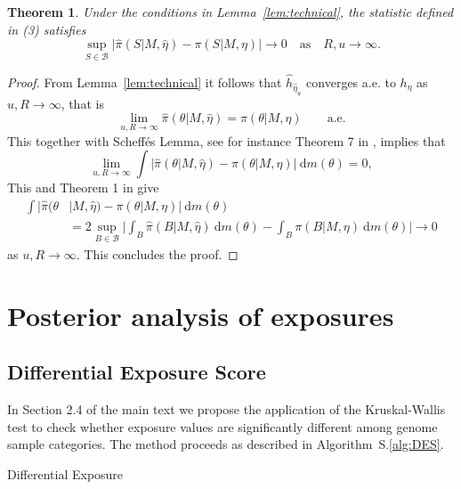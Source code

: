 \documentclass[11pt]{amsart}
\makeatletter
\def\BState{\State\hskip-\ALG@thistlm}
\newtheorem{theorem}{Theorem}
\theoremstyle{definition}
\makeatother
\begin{document}
\begin{theorem} Under the conditions in Lemma~\ref{lem:technical},
  the statistic defined in \textup{(3)} satisfies
\[
  \sup_{S \in  \mathcal B} 
     \big| 
         \hat\pi(S|M, \hat\eta) -  \pi(S|M, \eta)
     \big| \to 0 \quad \text{as}\quad R, u \to \infty.
\]
\end{theorem}
\begin{proof}
From Lemma~\ref{lem:technical} it follows that $\widehat
h_{\hat\eta_u}$ converges a.e. to $h_\eta$ as $u, R \to \infty$, that
is 
\[
  \lim_{u, R \to \infty} \widehat\pi(\theta|M, \hat\eta) 
  =
  \pi(\theta|M,\eta)\qquad\text{a.e.}
\]
This together with Scheff\'es Lemma, see for instance Theorem 7 in
\cite{DG}, implies that 
\[
  \lim_{u, R \to \infty} 
  \int \big|\widehat\pi(\theta|M, \hat\eta) - \pi(\theta|M,
  \eta)\big|\ \text{d}m(\theta) 
  =  
  0,
\]
This and Theorem 1 in \cite{DG} give
\begin{align*}
  \int \big|\widehat\pi(\theta &| M, \hat\eta) 
   - 
  \pi(\theta|M, \eta)\big|\ \text{d}m(\theta)                \\
  &=
  2 \sup_{B \in \mathcal B}\Bigg|
      \int_B \widehat\pi(B|M, \hat\eta)\ \text{d}m(\theta) 
      -
      \int_B \pi(B|M, \eta)\ \text{d}m(\theta)
   \Big| \to 0
\end{align*}
as $u, R \to \infty$. This concludes the proof.
\end{proof}

\section{Posterior analysis of exposures}
\subsection{Differential Exposure Score}
In Section 2.4 of the main text we propose the application of the
Kruskal-Wallis test to check whether exposure values are
significantly different among genome sample categories.  The method
proceeds as described in Algorithm~S.\ref{alg:DES}.

\begin{algorithm}
\caption{Differential Exposure}\label{alg:DES}
\end{algorithm}
\end{document}
